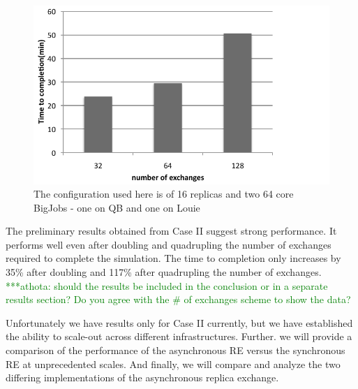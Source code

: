 \documentclass[a4paper,10pt]{article}
\newcommand{\jhanote}[1]{ {\textcolor{red} { ***shantenu: #1 }}}
\newcommand{\athotanote}[1]{ {\textcolor{green} { ***athota: #1 }}}
\newcommand{\jhanote}[1]{}
\newcommand{\athotanote}[1]{}
\begin{document}
\begin{figure}
\centering
\includegraphics[scale=0.5]{figures/graph_async.pdf}
\caption{\small The configuration used here is of 16 replicas and two 64 core BigJobs - one on QB and one on Louie}
\label{fig:graph}
\end{figure}

The preliminary results obtained from Case II suggest strong performance. It performs well even after doubling and quadrupling the number of exchanges required to complete the simulation. The time to completion only increases by 35\% after doubling and 117\% after quadrupling the number of exchanges.
 \athotanote{should the results be included in the conclusion or in a separate results section? Do you agree with the \# of exchanges scheme to show the data?}

Unfortunately we have results only for Case II currently, but we have established the ability to scale-out across different infrastructures. Further. we will provide a comparison of the performance of the asynchronous RE versus the synchronous RE at unprecedented scales. And finally, we will compare and analyze the two differing implementations of the asynchronous replica exchange.


 
  
 
\end{document}
